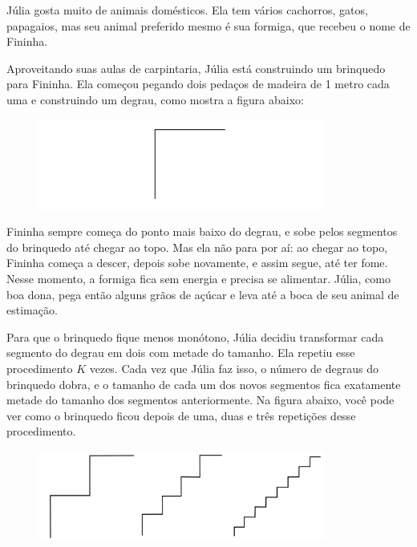 Júlia gosta muito de animais domésticos. Ela tem vários cachorros, gatos, papagaios, mas seu animal preferido mesmo é sua formiga, que recebeu o nome de Fininha.

Aproveitando suas aulas de carpintaria, Júlia está construindo um brinquedo para Fininha.
Ela começou pegando dois pedaços de madeira de 1 metro cada uma e construindo um degrau,
como mostra a figura abaixo:

\begin{figure}[h]
\begin{center}
  \includegraphics[height=8em]{./degrau}
\end{center}
\end{figure}

Fininha sempre começa do ponto mais baixo do degrau, e sobe pelos segmentos do brinquedo até chegar ao topo. Mas ela não para por aí: ao chegar ao topo, Fininha começa a descer, depois sobe novamente, e assim segue, até ter fome. Nesse momento, a formiga fica sem energia e precisa se alimentar. Júlia, como boa dona, pega então alguns grãos de açúcar e leva até a boca de seu animal de estimação.

Para que o brinquedo fique menos monótono, Júlia decidiu transformar cada segmento do degrau em dois com metade do tamanho. Ela repetiu esse procedimento $K$ vezes. Cada vez que Júlia faz isso, o número de degraus do brinquedo dobra, e o tamanho de cada um dos novos segmentos fica exatamente metade do tamanho dos segmentos anteriormente. Na figura abaixo, você pode ver como o brinquedo ficou depois de uma, duas e três repetições desse procedimento.

\begin{figure}[h]
\begin{center}
  \includegraphics[height=8em]{./degraus_k123}
\end{center}
\end{figure}

